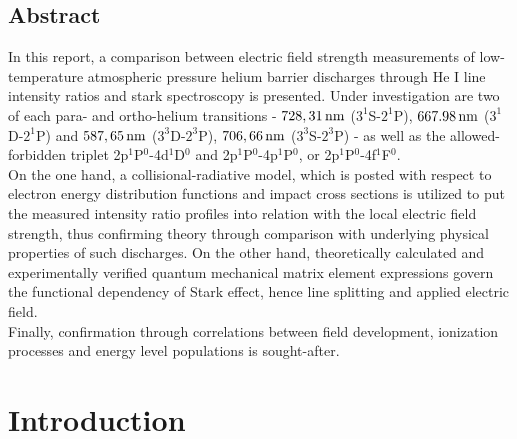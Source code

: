 \documentclass[a4paper,10pt,twoside]{article}
\begin{document}
	\begin{multicols}{2}
		\tableofcontents
	\end{multicols}
	
		\vspace{0.75cm}
	
		\subsection*{Abstract}
		
			In this report, a comparison between electric field strength measurements of low-temperature atmospheric pressure helium barrier discharges through He I line intensity ratios and stark spectroscopy is presented. Under investigation are two of each para- and ortho-helium transitions - $\unit[728,31]{nm}$ ($3^1$S-$2^1$P), $\unit[667.98]{nm}$ ($3^1$D-$2^1$P) and $\unit[587,65]{nm}$ ($3^3$D-$2^3$P), $\unit[706,66]{nm}$ ($3^3$S-$2^3$P) - as well as the allowed-forbidden triplet 2p$^1$P$^0$-4d$^1$D$^0$ and 2p$^1$P$^0$-4p$^1$P$^0$, or 2p$^1$P$^0$-4f$^1$F$^0$.\\
			On the one hand, a collisional-radiative model, which is posted with respect to electron energy distribution
			functions and impact cross sections is utilized to put the measured intensity ratio profiles into relation with the local electric field strength, thus confirming theory through comparison with underlying physical properties of such discharges. On the other hand, theoretically calculated and experimentally verified quantum mechanical matrix element expressions govern the functional dependency of Stark effect, hence line splitting and applied electric field.\\
			Finally, confirmation through correlations between field development, ionization processes and energy level populations is sought-after. 
			
					 
	\twocolumn

	\section{Introduction}\label{sec:intro}
\end{document}
